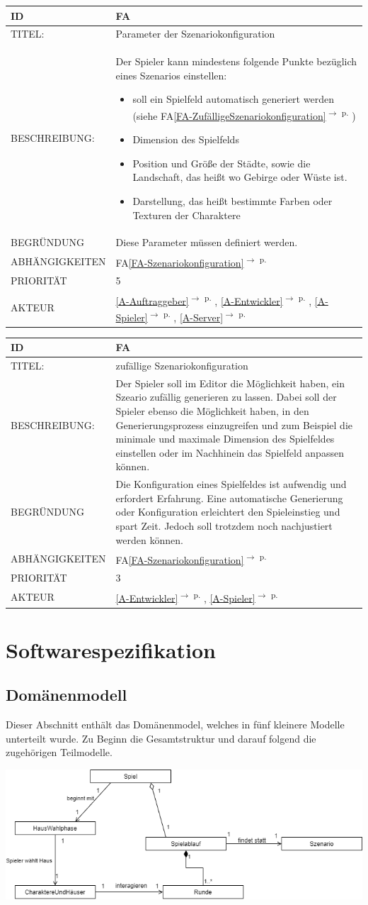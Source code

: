 \documentclass{uulm-assignment}
\newcounter{fa}
\newcommand{\fa}[7]{
\refstepcounter{fa}\label{#7}
\begin{tabularx}{16cm}{l|X}
\textbf{ID} & \textbf{FA\arabic{fa}} \\
\hline
TITEL: & #1 \\
\hline
BESCHREIBUNG: & #2 \\
\hline
BEGRÜNDUNG & #3 \\ 
\hline
ABHÄNGIGKEITEN & #4\\ 
\hline 
PRIORITÄT & #5\\ 
\hline 
AKTEUR & #6
\end{tabularx}
}
\newcommand{\rref}[1]{\ref{#1}\textsuperscript{$\rightarrow$ p. \pageref{#1}}}
\newcommand{\faref}[1]{FA\ref{#1}\textsuperscript{$\rightarrow$ p. \pageref{#1}}}
\begin{document}
\fa{Parameter der Szenariokonfiguration}{Der Spieler kann mindestens folgende Punkte bezüglich eines Szenarios einstellen: 
\begin{itemize}
    \item soll ein Spielfeld automatisch generiert werden (siehe \faref{FA-ZufälligeSzenariokonfiguration})
    \item Dimension des Spielfelds
    \item Position und Größe der Städte, sowie die Landschaft, das heißt wo Gebirge oder Wüste ist. 
    \item Darstellung, das heißt bestimmte Farben oder Texturen der Charaktere
\end{itemize}}{Diese Parameter müssen definiert werden.}{\faref{FA-Szenariokonfiguration}}{5}{\rref{A-Auftraggeber}, \rref{A-Entwickler}, \rref{A-Spieler}, \rref{A-Server}}{FA-Parameter-Szenariokonfiguration}


\fa{zufällige Szenariokonfiguration}{Der Spieler soll im Editor die Möglichkeit haben, ein Szeario zufällig generieren zu lassen. Dabei soll der Spieler ebenso die Möglichkeit haben, in den Generierungsprozess einzugreifen und zum Beispiel die minimale und maximale Dimension des Spielfeldes einstellen oder im Nachhinein das Spielfeld anpassen können.
}{Die Konfiguration eines Spielfeldes ist aufwendig und erfordert Erfahrung. Eine automatische Generierung oder Konfiguration erleichtert den Spieleinstieg und spart Zeit. Jedoch soll trotzdem noch nachjustiert werden können.}{\faref{FA-Szenariokonfiguration}}{3}{\rref{A-Entwickler}, \rref{A-Spieler}}{FA-ZufälligeSzenariokonfiguration}

\section{Softwarespezifikation}
\subsection{Domänenmodell}
Dieser Abschnitt enthält das Domänenmodel, welches in fünf kleinere Modelle unterteilt wurde. Zu Beginn die Gesamtstruktur und darauf folgend die zugehörigen Teilmodelle.

\centering
\includegraphics[width=\textwidth]{images/DMMain}
\label{fig:dmmain}
\end{document}
